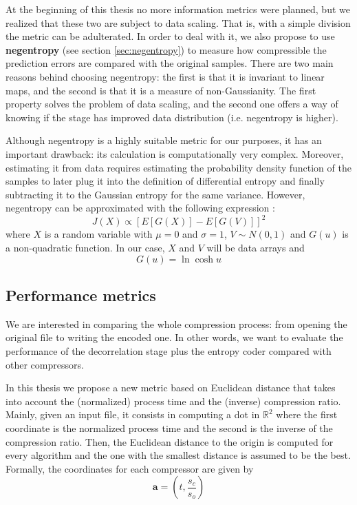 At the beginning of this thesis no more information metrics were planned, but we realized that these two are subject to data scaling. That is, with a simple division the metric can be adulterated. In order to deal with it, we also propose to use \textbf{negentropy} (see section \ref{sec:negentropy}) to measure how compressible the prediction errors are compared with the original samples. There are two main reasons behind choosing negentropy: the first is that it is invariant to linear maps, and the second is that it is a measure of non-Gaussianity. The first property solves the problem of data scaling, and the second one offers a way of knowing if the stage has improved data distribution (i.e. negentropy is higher).

Although negentropy is a highly suitable metric for our purposes, it has an important drawback: its calculation is computationally very complex. Moreover, estimating it from data requires estimating the probability density function of the samples to later plug it into the definition of differential entropy and finally subtracting it to the Gaussian entropy for the same variance. However, negentropy can be approximated with the following expression \parencite{HYVARINEN2000411}:
\begin{equation}
J(X) \propto \left[E[G(X)] - E[G(V)]\right]^2
\end{equation}
where $X$ is a random variable with $\mu = 0$ and $\sigma = 1$, $V \sim N(0,1)$ and $G(u)$ is a non-quadratic function. In our case, $X$ and $V$ will be data arrays and
\begin{equation}
G(u) = \ln \cosh u
\end{equation}

\subsection{Performance metrics} \label{sec:euclidean}
We are interested in comparing the whole compression process: from opening the original file to writing the encoded one. In other words, we want to evaluate the performance of the decorrelation stage plus the entropy coder compared with other compressors.

In this thesis we propose a new metric based on Euclidean distance that takes into account the (normalized) process time and the (inverse) compression ratio. Mainly, given an input file, it consists in computing a dot in $\mathbb{R}^2$ where the first coordinate is the normalized process time and the second is the inverse of the compression ratio. Then, the Euclidean distance to the origin is computed for every algorithm and the one with the smallest distance is assumed to be the best. Formally, the coordinates for each compressor are given by
\begin{equation} \label{eq:dot_comp}
\mathbf{a} = \left(t, \frac{s_c}{s_o}\right)
\end{equation}

